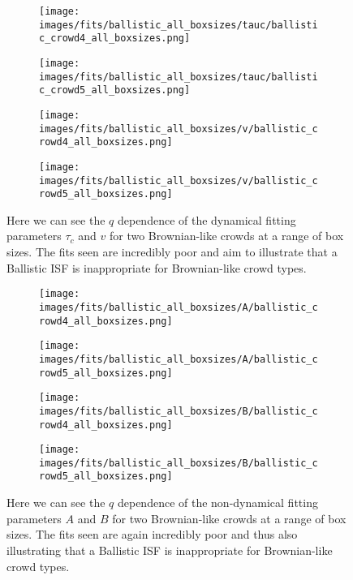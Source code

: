 \documentclass[10pt]{article}
\begin{document}
\begin{figure}[H]
\begin{subfigure}[t]{.5\textwidth}
  \centering
 \texttt{[image: images/fits/ballistic\_all\_boxsizes/tauc/ballistic\_crowd4\_all\_boxsizes.png]}
  \caption{}
\end{subfigure}%
\hfill
\begin{subfigure}[t]{.5\textwidth}
  \centering
  \texttt{[image: images/fits/ballistic\_all\_boxsizes/tauc/ballistic\_crowd5\_all\_boxsizes.png]}
  \caption{}
\end{subfigure}
\label{fig:crowd_ballistic_fits_tauc_all_boxsizes}
\par\bigskip
\begin{subfigure}[t]{.5\textwidth}
  \centering
 \texttt{[image: images/fits/ballistic\_all\_boxsizes/v/ballistic\_crowd4\_all\_boxsizes.png]}
  \caption{}
\end{subfigure}%
\hfill
\begin{subfigure}[t]{.5\textwidth}
  \centering
  \texttt{[image: images/fits/ballistic\_all\_boxsizes/v/ballistic\_crowd5\_all\_boxsizes.png]}
  \caption{}
\end{subfigure}
\caption{Here we can see the $q$ dependence of the dynamical fitting parameters $\tau_c$ and $v$ for two Brownian-like crowds at a range of box sizes. The fits seen are incredibly poor and aim to illustrate that a Ballistic ISF is inappropriate for Brownian-like crowd types.}
\label{fig:crowd_ballistic_fits_v_all_boxsizes}
\end{figure}

\begin{figure}[H]
\begin{subfigure}[t]{.5\textwidth}
  \centering
 \texttt{[image: images/fits/ballistic\_all\_boxsizes/A/ballistic\_crowd4\_all\_boxsizes.png]}
  \caption{}
\end{subfigure}%
\hfill
\begin{subfigure}[t]{.5\textwidth}
  \centering
  \texttt{[image: images/fits/ballistic\_all\_boxsizes/A/ballistic\_crowd5\_all\_boxsizes.png]}
  \caption{}
\end{subfigure}
\label{fig:crowd_ballistic_fits_A_all_boxsizes}
\par\bigskip
\begin{subfigure}[t]{.5\textwidth}
  \centering
 \texttt{[image: images/fits/ballistic\_all\_boxsizes/B/ballistic\_crowd4\_all\_boxsizes.png]}
  \caption{}
\end{subfigure}%
\hfill
\begin{subfigure}[t]{.5\textwidth}
  \centering
  \texttt{[image: images/fits/ballistic\_all\_boxsizes/B/ballistic\_crowd5\_all\_boxsizes.png]}
  \caption{}
\end{subfigure}
\caption{Here we can see the $q$ dependence of the non-dynamical fitting parameters $A$ and $B$ for two Brownian-like crowds at a range of box sizes. The fits seen are again incredibly poor and thus also illustrating that a Ballistic ISF is inappropriate for Brownian-like crowd types.}
\label{fig:crowd_ballistic_fits_tauc_B_boxsizes}
\end{figure}
\end{document}
